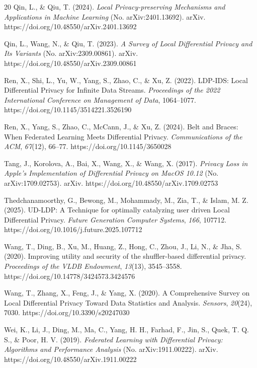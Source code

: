 \documentclass[conference]{IEEEtran}
\begin{document}
\begin{thebibliography}{20}
Qin, L., \& Qiu, T. (2024). \emph{Local Privacy-preserving Mechanisms and Applications in Machine Learning} (No. arXiv:2401.13692). arXiv. https://doi.org/10.48550/arXiv.2401.13692

Qin, L., Wang, N., \& Qiu, T. (2023). \emph{A Survey of Local Differential Privacy and Its Variants} (No. arXiv:2309.00861). arXiv. https://doi.org/10.48550/arXiv.2309.00861

Ren, X., Shi, L., Yu, W., Yang, S., Zhao, C., \& Xu, Z. (2022). LDP-IDS: Local Differential Privacy for Infinite Data Streams. \emph{Proceedings of the 2022 International Conference on Management of Data}, 1064--1077. https://doi.org/10.1145/3514221.3526190

Ren, X., Yang, S., Zhao, C., McCann, J., \& Xu, Z. (2024). Belt and Braces: When Federated Learning Meets Differential Privacy. \emph{Communications of the ACM}, \emph{67}(12), 66--77. https://doi.org/10.1145/3650028

Tang, J., Korolova, A., Bai, X., Wang, X., \& Wang, X. (2017). \emph{Privacy Loss in Apple's Implementation of Differential Privacy on MacOS 10.12} (No. arXiv:1709.02753). arXiv. https://doi.org/10.48550/arXiv.1709.02753

Thedchanamoorthy, G., Bewong, M., Mohammady, M., Zia, T., \& Islam, M. Z. (2025). UD-LDP: A Technique for optimally catalyzing user driven Local Differential Privacy. \emph{Future Generation Computer Systems}, \emph{166}, 107712. https://doi.org/10.1016/j.future.2025.107712

Wang, T., Ding, B., Xu, M., Huang, Z., Hong, C., Zhou, J., Li, N., \& Jha, S. (2020). Improving utility and security of the shuffler-based differential privacy. \emph{Proceedings of the VLDB Endowment}, \emph{13}(13), 3545--3558. https://doi.org/10.14778/3424573.3424576

Wang, T., Zhang, X., Feng, J., \& Yang, X. (2020). A Comprehensive Survey on Local Differential Privacy Toward Data Statistics and Analysis. \emph{Sensors}, \emph{20}(24), 7030. https://doi.org/10.3390/s20247030

Wei, K., Li, J., Ding, M., Ma, C., Yang, H. H., Farhad, F., Jin, S., Quek, T. Q. S., \& Poor, H. V. (2019). \emph{Federated Learning with Differential Privacy: Algorithms and Performance Analysis} (No. arXiv:1911.00222). arXiv. https://doi.org/10.48550/arXiv.1911.00222


\end{thebibliography}
\end{document}
